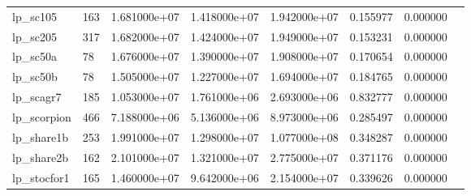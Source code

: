 \begin{tabular}{llrrrrrr}
lp\_sc105                &  163 &  1.681000e+07 &  1.418000e+07 &  1.942000e+07 &  0.155977 &  0.000000 \\
lp\_sc205                &  317 &  1.682000e+07 &  1.424000e+07 &  1.949000e+07 &  0.153231 &  0.000000 \\
lp\_sc50a                &   78 &  1.676000e+07 &  1.390000e+07 &  1.908000e+07 &  0.170654 &  0.000000 \\
lp\_sc50b                &   78 &  1.505000e+07 &  1.227000e+07 &  1.694000e+07 &  0.184765 &  0.000000 \\
lp\_scagr7               &  185 &  1.053000e+07 &  1.761000e+06 &  2.693000e+06 &  0.832777 &  0.000000 \\
lp\_scorpion             &  466 &  7.188000e+06 &  5.136000e+06 &  8.973000e+06 &  0.285497 &  0.000000 \\
lp\_share1b              &  253 &  1.991000e+07 &  1.298000e+07 &  1.077000e+08 &  0.348287 &  0.000000 \\
lp\_share2b              &  162 &  2.101000e+07 &  1.321000e+07 &  2.775000e+07 &  0.371176 &  0.000000 \\
lp\_stocfor1             &  165 &  1.460000e+07 &  9.642000e+06 &  2.154000e+07 &  0.339626 &  0.000000 \\
\bottomrule
\end{tabular}
